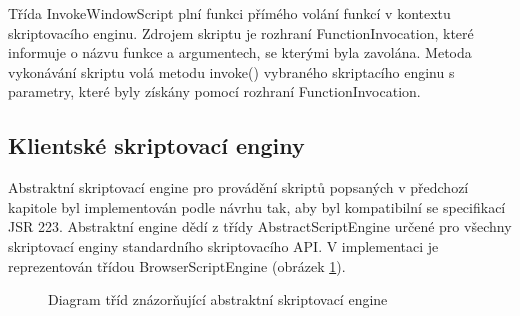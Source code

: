 Třída InvokeWindowScript plní funkci přímého volání funkcí v kontextu skriptovacího enginu. Zdrojem skriptu je rozhraní FunctionInvocation, které informuje o názvu funkce a argumentech, se kterými byla zavolána. Metoda vykonávání skriptu volá metodu invoke() vybraného skriptacího enginu s parametry, které byly získány pomocí rozhraní FunctionInvocation.

\subsection{Klientské skriptovací enginy}
\label{Chapter.Implementation.ScriptEngines}

Abstraktní skriptovací engine pro provádění skriptů popsaných v předchozí kapitole byl implementován podle návrhu tak, aby byl kompatibilní se specifikací JSR 223. Abstraktní engine dědí z třídy AbstractScriptEngine určené pro všechny skriptovací enginy standardního skriptovacího API. V implementaci je reprezentován třídou BrowserScriptEngine (obrázek \ref{Figure.BrowserScriptEngine}).

\begin{figure}[H]
  \begin{center}
    \caption{Diagram tříd znázorňující abstraktní skriptovací engine}
    \label{Figure.BrowserScriptEngine}
  \end{center}
\end{figure}

